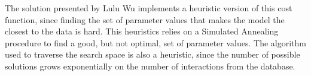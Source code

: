 The solution presented by Lulu Wu implements a heuristic version of this 
cost function, since finding the set of parameter values that makes the 
model the closest to the data is hard. This heuristics relies on a 
Simulated Annealing procedure to find a good, but not optimal, set of
parameter values. The algorithm used to traverse the search space is 
also a heuristic, since the number of possible solutions grows 
exponentially on the number of interactions from the database.

